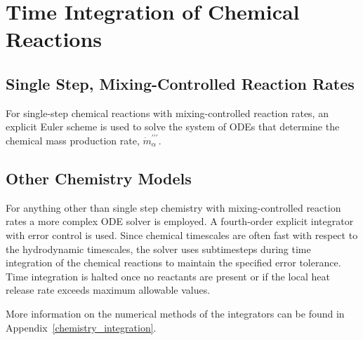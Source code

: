 \section{Time Integration of Chemical Reactions}

\subsection{Single Step, Mixing-Controlled Reaction Rates}
For single-step chemical reactions with mixing-controlled reaction rates, an explicit Euler scheme is used to solve the system of ODEs that determine the chemical mass production rate, $\dot{m}^{\prime\prime\prime}_{\alpha}$. 

\subsection{Other Chemistry Models}

For anything other than single step chemistry with mixing-controlled reaction rates a more complex ODE solver is employed.  A fourth-order explicit integrator with error control is used.  Since chemical timescales are often fast with respect to the hydrodynamic timescales, the solver uses subtimesteps during time integration of the chemical reactions to maintain the specified error tolerance.  Time integration is halted once no reactants are present or if the local heat release rate exceeds maximum allowable values.

More information on the numerical methods of the integrators can be found in Appendix~\ref{chemistry_integration}.


